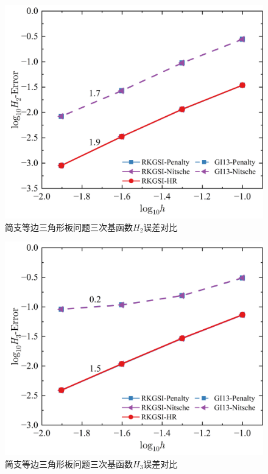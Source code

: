 \begin{figure}[H]
    \centering
    \includegraphics[scale=0.5]{figure/PHR/T/CH2.png}
    \caption{简支等边三角形板问题三次基函数$H_2$误差对比}
\end{figure}
\newpage
\begin{figure}[H]
    \centering
    \includegraphics[scale=0.5]{figure/PHR/T/CH3.png}
    \caption{简支等边三角形板问题三次基函数$H_3$误差对比}
\end{figure}
